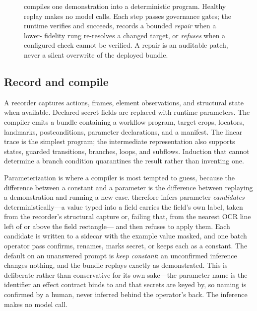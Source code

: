 \begin{figure}[t]
\caption{\system{} compiles one demonstration into a deterministic program.
Healthy replay makes no model calls. Each step passes governance gates; the
runtime verifies and succeeds, records a bounded \emph{repair} when a lower-
fidelity rung re-resolves a changed target, or \emph{refuses} when a configured
check cannot be verified. A repair is an auditable patch, never a silent
overwrite of the deployed bundle.}
\label{fig:pipeline}
\end{figure}

\subsection{Record and compile}
A recorder captures actions, frames, element observations, and structural state
when available. Declared secret fields are replaced with runtime parameters.
The compiler emits a bundle containing a workflow program, target crops,
locators, landmarks, postconditions, parameter declarations, and a manifest.
The linear trace is the simplest program; the intermediate representation also
supports states, guarded transitions, branches, loops, and subflows. Induction
that cannot determine a branch condition quarantines the result rather than
inventing one.

Parameterization is where a compiler is most tempted to guess, because the
difference between a constant and a parameter is the difference between
replaying a demonstration and running a new case. \system{} therefore infers
parameter \emph{candidates} deterministically---a value typed into a field
carries the field's own label, taken from the recorder's structural capture or,
failing that, from the nearest OCR line left of or above the field rectangle---
and then refuses to apply them. Each candidate is written to a sidecar with the
example value masked, and one batch operator pass confirms, renames, marks
secret, or keeps each as a constant. The default on an unanswered prompt is
\emph{keep constant}: an unconfirmed inference changes nothing, and the bundle
replays exactly as demonstrated. This is deliberate rather than conservative
for its own sake---the parameter name is the identifier an effect contract binds
to and that secrets are keyed by, so naming is confirmed by a human, never
inferred behind the operator's back. The inference makes no model call.

